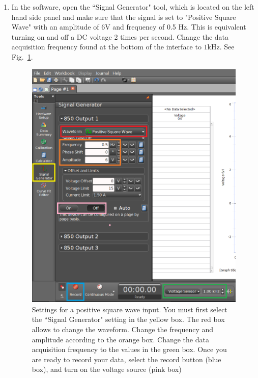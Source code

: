 \documentclass[12pt]{report}
\begin{document}
\begin{enumerate}
\item In the software, open the ``Signal Generator" tool, which is located on the left hand side panel and make sure that the signal is set to "Positive Square Wave" with an amplitude of 6V and frequency of 0.5 Hz. This is equivalent turning on and off a DC voltage 2 times per second. Change the data acquisition frequency found at the bottom of the interface to $1$kHz. See Fig.~\ref{Fig:lab2-interface-square-wave}.
\begin{figure}[h]
\centering
\includegraphics[scale=0.5]{lab2-interface-square-wave}
\caption{Settings for a positive square wave input. You must first select the ``Signal Generator" setting in the yellow box. The red box allows to change the waveform. Change the frequency and amplitude according to the orange box. Change the data acquisition frequency to the values in the green box. Once you are ready to record your data, select the record button (blue box), and turn on the voltage source (pink box)}
\label{Fig:lab2-interface-square-wave}
\end{figure}


\end{enumerate}
\end{document}
